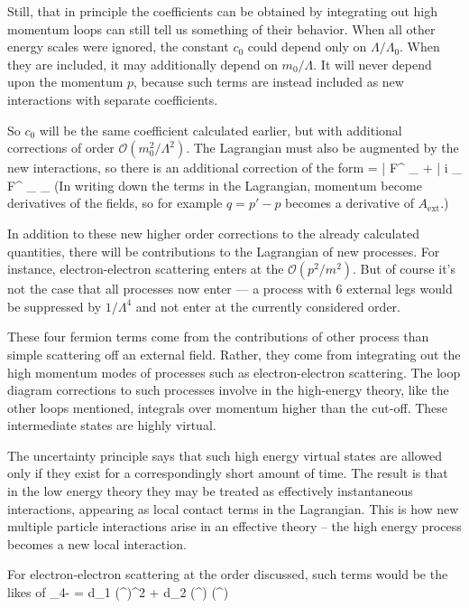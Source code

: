 Still, that in principle the coefficients can be obtained by integrating out high momentum loops can still tell us something of their behavior.  When all other energy scales were ignored, the constant $c_0$ could depend only on $\Lambda/\Lambda_0$.  When they are included, it may additionally depend on $m_0 / \Lambda$.  It will never depend upon the momentum $p$, because such terms are instead included as new interactions with separate coefficients.

So $c_0$ will be the same coefficient calculated earlier, but with additional corrections of order $\mathcal{O}(m_0^2/\Lambda^2)$.  The Lagrangian must also be augmented by the new interactions, so there is an additional correction of the form
\beq
	\delta {} =  \bar{\Psi} F^{\mu\nu} \sigma_{\mu\nu} \Psi 
				+  \bar{\Psi} i \partial_{\mu} F^{\mu\nu} \sigma_{\mu\nu} \partial_{\nu} \Psi
\eeq
(In writing down the terms in the Lagrangian, momentum become derivatives of the fields, so for example $q = p' - p$ becomes a derivative of $A_\text{ext}$.) 


In addition to these new higher order corrections to the already calculated quantities, there will be contributions to the Lagrangian of new processes.  For instance, electron-electron scattering enters at the $\mathcal{O}(p^2/m^2)$.  But of course it's not the case that all processes now enter --- a process with 6 external legs would be suppressed by $1/\Lambda^4$ and not enter at the currently considered order.

These four fermion terms come from the contributions of other process than simple scattering off an external field.  Rather, they come from integrating out the high momentum modes of processes such as electron-electron scattering.  The loop diagram corrections to such processes involve in the high-energy theory, like the other loops mentioned, integrals over momentum higher than the cut-off.  These intermediate states are highly virtual.  

The uncertainty principle says that such high energy virtual states are allowed only if they exist for a correspondingly short amount of time.  The result is that in the low energy theory they may be treated as effectively instantaneous interactions, appearing as local contact terms in the Lagrangian.  This is how new multiple particle interactions arise in an effective theory -- the high energy process becomes a new local interaction. 

For electron-electron scattering at the order discussed, such terms would be the likes of
\beq
\delta {}_{4-} = d_1  (\Psi^\dagger \Psi)^2 
		+ d_2  (\Psi^\dagger \gamma \Psi) \cdot (\Psi^\dagger \gamma \Psi) 
\eeq

